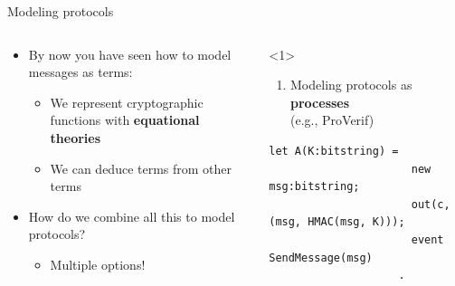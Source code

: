 \documentclass[11pt,aspectratio=169]{beamer}
\begin{document}
\begin{frame}[fragile]{Modeling protocols}
    \begin{columns}
        \begin{column}{0.5\textwidth}
            \begin{itemize}
                \item By now you have seen how to model messages as terms:
                \begin{itemize}
                    \item We represent cryptographic functions with
                          \textbf{equational theories}
                    \item We can deduce terms from other terms
                \end{itemize}
                \item How do we combine all this to model protocols?
                \begin{itemize}
                    \item Multiple options!
                \end{itemize}
            \end{itemize}
        \end{column}
        \begin{column}{0.5\textwidth}
            \begin{onlyenv}<1>
                \begin{enumerate}
                    \item Modeling protocols as \textbf{processes}\\
                    (e.g., ProVerif)
                \end{enumerate}
                \vspace*{.5cm}
                \begin{lstlisting}[style=proverif,gobble=16]
                    let A(K:bitstring) =
                      new msg:bitstring;
                      out(c, (msg, HMAC(msg, K)));
                      event SendMessage(msg)
                    .


\end{lstlisting}
\end{onlyenv}
\end{column}
\end{columns}
\end{frame}
\end{document}
